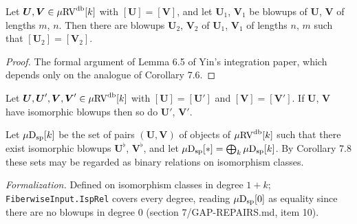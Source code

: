 \setcounter{theorem}{6}
\begin{lemma}
\label{blowup-equi-class-coa}
\leanok
{}
Let $\boldsymbol{U}, \boldsymbol{V} \in \mu\mathrm{RV}^{\operatorname{db}}[k]$ with $[\boldsymbol{U}] = [\boldsymbol{V}]$, and let $\boldsymbol{U}_1$, $\boldsymbol{V}_1$ be blowups of $\boldsymbol{U}$, $\boldsymbol{V}$ of lengths $m$, $n$. Then there are blowups $\boldsymbol{U}_2$, $\boldsymbol{V}_2$ of $\boldsymbol{U}_1$, $\boldsymbol{V}_1$ of lengths $n$, $m$ such that $[\boldsymbol{U}_2] = [\boldsymbol{V}_2]$.
\end{lemma}

\begin{proof}
\leanok
The formal argument of Lemma 6.5 of Yin's integration paper, which depends only on the analogue of Corollary 7.6.
\end{proof}

\setcounter{theorem}{7}
\begin{corollary}
\label{blowup-equi-class}
\leanok
{}
Let $\boldsymbol{U}, \boldsymbol{U}', \boldsymbol{V}, \boldsymbol{V}' \in \mu\mathrm{RV}^{\operatorname{db}}[k]$ with $[\boldsymbol{U}] = [\boldsymbol{U}']$ and $[\boldsymbol{V}] = [\boldsymbol{V}']$. If $\boldsymbol{U}$, $\boldsymbol{V}$ have isomorphic blowups then so do $\boldsymbol{U}'$, $\boldsymbol{V}'$.
\end{corollary}

\setcounter{theorem}{8}
\begin{definition}
\label{s7-mu-isp-db}
\leanok
{}
Let $\mu\mathrm{D}_{\mathrm{sp}}[k]$ be the set of pairs $(\boldsymbol{U}, \boldsymbol{V})$ of objects of $\mu\mathrm{RV}^{\operatorname{db}}[k]$ such that there exist isomorphic blowups $\boldsymbol{U}^\flat$, $\boldsymbol{V}^\flat$, and let $\mu\mathrm{D}_{\mathrm{sp}}[*] = \bigoplus_k \mu\mathrm{D}_{\mathrm{sp}}[k]$. By Corollary 7.8 these sets may be regarded as binary relations on isomorphism classes.

\emph{Formalization.} Defined on isomorphism classes in degree $1 + k$; \texttt{FiberwiseInput.IspRel} covers every degree, reading $\mu\mathrm{D}_{\mathrm{sp}}[0]$ as equality since there are no blowups in degree $0$ (section 7/GAP-REPAIRS.md, item 10).
\end{definition}

